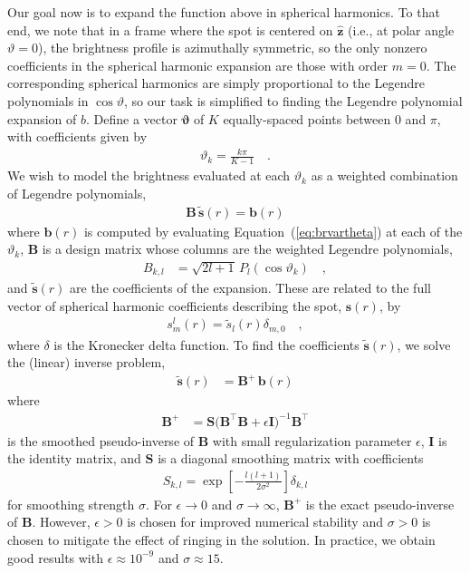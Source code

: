 \documentclass[modern]{aastex62}
\begin{document}
Our goal now is to expand the function above in spherical harmonics. To that end,
we note that in a frame where the spot is centered on $\hat{\mathbf{z}}$
(i.e., at polar angle $\vartheta = 0$), the brightness profile is azimuthally
symmetric, so the only nonzero coefficients in the spherical harmonic
expansion are those with order $m = 0$. The corresponding spherical harmonics are
simply proportional to the Legendre polynomials in $\cos\vartheta$, so our task is
simplified to finding the Legendre polynomial expansion of $b$.
Define a vector $\pmb{\vartheta}$ of $K$ equally-spaced points
between $0$ and $\pi$, with coefficients given by
%
\begin{align}
    \vartheta_k = \frac{k\pi}{K-1}
    \quad.
\end{align}
%
We wish to model the brightness evaluated at each $\vartheta_k$
as a weighted combination of Legendre polynomials,
%
\begin{align}
    \mathbf{B} \, \tilde{\mathbf{s}}(r) = \mathbf{b}(r)
\end{align}
%
%
where $\mathbf{b}(r)$ is computed by evaluating Equation~(\ref{eq:brvartheta})
at each of the $\vartheta_k$,
$\mathbf{B}$ is a design matrix whose columns are
the weighted Legendre polynomials,
%
\begin{align}
    B_{k,l} & = \sqrt{2l + 1} \, P_l\left( \cos \vartheta_k \right)
    \quad,
\end{align}
%
and $\tilde{\mathbf{s}}(r)$ are the coefficients of the expansion.
These are related to the full vector of spherical harmonic coefficients describing
the spot, $\mathbf{s}(r)$, by
%
\begin{align}
    s^l_m(r) = \tilde{s}_l(r) \delta_{m,0}
    \quad,
\end{align}
%
where $\delta$ is the Kronecker delta function.
To find the coefficients $\tilde{\mathbf{s}}(r)$, we solve the (linear) inverse problem,
%
\begin{align}
    \tilde{\mathbf{s}}(r) & = \mathbf{B}^+ \, \mathbf{b}(r)
\end{align}
%
%
where
%
\begin{align}
    \mathbf{B}^+ & = \mathbf{S} \Big(\mathbf{B}^\top \mathbf{B} +
    \epsilon \mathbf{I}\Big)^{-1} \mathbf{B}^\top
\end{align}
%
is the smoothed pseudo-inverse of $\mathbf{B}$ with small regularization
parameter $\epsilon$, $\mathbf{I}$ is the identity matrix, and
$\mathbf{S}$ is a diagonal smoothing matrix with coefficients
%
\begin{align}
    S_{k,l} = \exp\left[-\frac{l(l + 1)}{2\sigma^2}\right] \delta_{k,l}
\end{align}
%
for smoothing strength $\sigma$. For $\epsilon \rightarrow 0$ and
$\sigma \rightarrow \infty$,
$\mathbf{B}^+$ is the exact pseudo-inverse of
$\mathbf{B}$. However,
$\epsilon > 0$ is chosen for improved numerical stability and
$\sigma > 0$ is chosen to mitigate the effect of ringing in the solution.
In practice, we obtain good results with $\epsilon \approx 10^{-9}$
and $\sigma \approx 15$.
\end{document}
